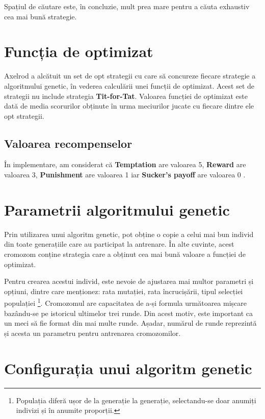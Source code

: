 Spațiul de căutare este, în concluzie, mult prea mare pentru a căuta exhaustiv cea mai bună strategie.

\section{Funcția de optimizat}

Axelrod a alcătuit un set de opt strategii cu care să concureze fiecare strategie a algoritmului genetic, în vederea calculării unei funcții de optimizat. Acest set de strategii nu include strategia \textbf{Tit-for-Tat}. Valoarea funcției de optimizat este dată de media scorurilor obținute în urma meciurilor jucate cu fiecare dintre ele opt strategii.

\subsection {Valoarea recompenselor}

În implementare, am considerat că \textbf{Temptation} are valoarea 5, \textbf{Reward} are valoarea 3, \textbf{Punishment} are valoarea 1 iar \textbf{Sucker's payoff} are valoarea 0 \cite{optimal_strategies}. 

\section {Parametrii algoritmului genetic}

Prin utilizarea unui algoritm genetic, pot obține o copie a celui mai bun individ din toate generațiile care au participat la antrenare. În alte cuvinte, acest cromozom conține strategia care a obținut cea mai bună valoare a funcției de optimizat. 

Pentru crearea acestui individ, este nevoie de ajustarea mai multor parametri și opțiuni, dintre care menționez: rata mutației, rata încrucișării, tipul selecției populației \footnote{Populația diferă ușor de la generație la generație, selectandu-se doar anumiți indivizi și în anumite proporții.}. Cromozomul are capacitatea de a-și formula următoarea mișcare bazându-se pe istoricul ultimelor trei runde. Din acest motiv, este important ca un meci să fie format din mai multe runde. Așadar, numărul de runde reprezintă și acesta un parametru pentru antrenarea cromozomilor. 

\section{Configurația unui algoritm genetic}

